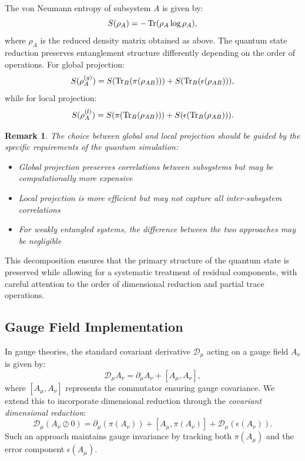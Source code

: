 \documentclass[sn-mathphys-num]{sn-jnl}
\theoremstyle{thmstyleone}
\theoremstyle{thmstyletwo}
\newtheorem{remark}{Remark}
\theoremstyle{thmstylethree}
\begin{document}
The von Neumann entropy of subsystem $A$ is given by:
\[
S(\rho_A) = -\Tr(\rho_A \log \rho_A),
\]
where $\rho_A$ is the reduced density matrix obtained as above. The quantum state reduction preserves entanglement structure differently depending on the order of operations. For global projection:
\[
S(\rho_A^{(g)}) = S(\Tr_B(\pi(\rho_{AB}))) + S(\Tr_B(\epsilon(\rho_{AB}))),
\]
while for local projection:
\[
S(\rho_A^{(l)}) = S(\pi(\Tr_B(\rho_{AB}))) + S(\epsilon(\Tr_B(\rho_{AB}))).
\]

\begin{remark}
The choice between global and local projection should be guided by the specific requirements of the quantum simulation:
\begin{itemize}
    \item Global projection preserves correlations between subsystems but may be computationally more expensive
    \item Local projection is more efficient but may not capture all inter-subsystem correlations
    \item For weakly entangled systems, the difference between the two approaches may be negligible
\end{itemize}
\end{remark}

This decomposition ensures that the primary structure of the quantum state is preserved while allowing for a systematic treatment of residual components, with careful attention to the order of dimensional reduction and partial trace operations.

\subsection{Gauge Field Implementation}
In gauge theories, the standard covariant derivative $\mathcal{D}_\mu$ acting on a gauge field $A_\nu$ is given by:
\[
\mathcal{D}_\mu A_\nu = \partial_\mu A_\nu + [A_\mu, A_\nu],
\]
where $[A_\mu, A_\nu]$ represents the commutator ensuring gauge covariance. We extend this to incorporate dimensional reduction through the \emph{covariant dimensional reduction}:
\[
\mathcal{D}_\mu (A_\nu \oslash 0) 
= \partial_\mu(\pi(A_\nu)) + [A_\mu, \pi(A_\nu)] + \mathcal{D}_\mu(\epsilon(A_\nu)).
\]
Such an approach maintains gauge invariance by tracking both $\pi(A_\mu)$ and the error component $\epsilon(A_\mu)$.
\end{document}
